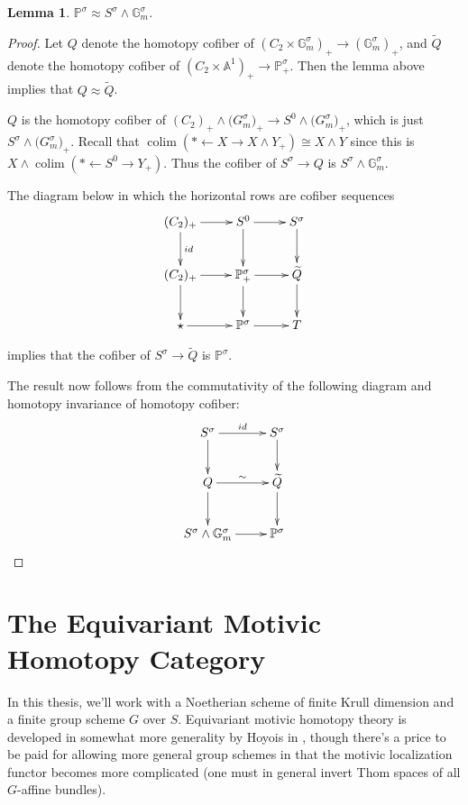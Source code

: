 \documentclass[edeposit,fullpage]{uiucthesis2009}
\newcommand{\mbb}{\mathbb}
\DeclareMathOperator*{\colim}{colim}
\theoremstyle{plain}
\newtheorem{lemma}{Lemma}
\numberwithin{lemma}{section}
\theoremstyle{definition}
\begin{document}
\begin{lemma}
$\mbb P^\sigma \approx S^\sigma \wedge \mbb G_m^\sigma$.
\end{lemma}

\begin{proof}
Let $Q$ denote the homotopy cofiber of $(C_2 \times \mbb G_m^\sigma)_+
\rightarrow (\mbb G_m^\sigma)_+$, and $\widetilde Q$ denote the homotopy
cofiber of $(C_2 \times \mbb A^1)_+ \rightarrow \mbb P^\sigma_+$. Then the
lemma above implies that $Q \approx \widetilde Q$. 

$Q$ is the homotopy cofiber of $
(C_2)_+ \wedge \mbb (G_m^\sigma)_+ \rightarrow S^0 \wedge \mbb
(G_m^\sigma)_+$, which is just $S^\sigma \wedge \mbb
(G_m^\sigma)_+$. Recall that $\colim(* \leftarrow X \rightarrow X
\wedge Y_+) \cong X \wedge Y$ since this is $X \wedge \colim(*
\leftarrow S^0 \rightarrow Y_+)$. Thus the cofiber of $S^\sigma
\rightarrow Q$ is $S^\sigma \wedge \mbb G_m^\sigma$.

The diagram below in which the horizontal rows are cofiber sequences
\[
\xymatrix{(C_2)_+ \ar[r]\ar[d]^{id} & S^0 \ar[d] \ar[r]& S^\sigma
  \ar[d] \\(C_2)_+ \ar[r]\ar[d] & \ar[r]\ar[d] \mbb P^\sigma_+ & \widetilde
  Q \ar[d] \\ \star \ar[r] & \mbb P^\sigma \ar[r] & T }
\]

implies that the cofiber of $S^\sigma \rightarrow \widetilde Q$ is
$\mbb P^\sigma$. 

The result now follows from the commutativity of the following diagram
and homotopy invariance of homotopy cofiber:
\[
\xymatrix{S^\sigma \ar[r]^{id}\ar[d] & S^\sigma \ar[d] \\ Q \ar[r]^{\sim} \ar[d]&
\widetilde Q \ar[d]\\ S^\sigma \wedge \mbb G_m^\sigma \ar[r] & \mbb P^\sigma}
\]

\end{proof}

\section{The Equivariant Motivic Homotopy Category}\label{sec:cat_def}

In this thesis, we'll work with a Noetherian scheme of finite Krull
dimension and a finite group scheme $G$ over $S$. Equivariant motivic
homotopy theory is developed in somewhat more generality by Hoyois in
\cite{HoyoisSixOp}, though there's a price to be paid for allowing
more general group schemes in that the motivic localization functor becomes more
complicated (one must in general invert Thom spaces of all $G$-affine
bundles).  
\end{document}
